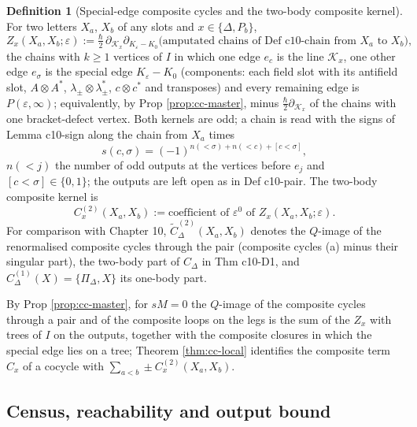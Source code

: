 \documentclass[11pt]{article}
\numberwithin{equation}{section}
\theoremstyle{plain}
\theoremstyle{definition}
\newtheorem{definition}[theorem]{Definition}
\begin{document}
\begin{definition}[Special-edge composite cycles and the two-body composite kernel]
\label{def:cc-sp}
For two letters $X_a$, $X_b$ of any slots and $x\in\{\Delta,P_b\}$,
\[
Z_x(X_a,X_b;\varepsilon):=\tfrac\hbar2\,\partial_{\mathcal K_x}\partial_{K_\varepsilon-K_0}\big(\text{amputated chains of Def c10-chain from }X_a\text{ to }X_b\big),
\]
the chains with $k\ge1$ vertices of $I$ in which one edge $e_c$ is the line $\mathcal K_x$, one other edge $e_\sigma$ is the special edge $K_\varepsilon-K_0$ (components: each field slot with its antifield slot, $A\otimes A^*$, $\lambda_\pm\otimes\lambda^*_\pm$, $c\otimes c^*$ and transposes) and every remaining edge is $P(\varepsilon,\infty)$; equivalently, by Prop \ref{prop:cc-master}, minus $\tfrac\hbar2\partial_{\mathcal K_x}$ of the chains with one bracket-defect vertex. Both kernels are odd; a chain is read with the signs of Lemma c10-sign along the chain from $X_a$ times
\[
s(c,\sigma)=(-1)^{n(<\sigma)+n(<c)+[c<\sigma]},
\]
$n(<j)$ the number of odd outputs at the vertices before $e_j$ and $[c<\sigma]\in\{0,1\}$; the outputs are left open as in Def c10-pair. The two-body composite kernel is
\[
C^{(2)}_x(X_a,X_b):=\text{coefficient of }\varepsilon^0\text{ of }Z_x(X_a,X_b;\varepsilon).
\]
For comparison with Chapter 10, $\widetilde C^{(2)}_\Delta(X_a,X_b)$ denotes the $Q$-image of the renormalised composite cycles through the pair (composite cycles (a) minus their singular part), the two-body part of $C_\Delta$ in Thm c10-D1, and $C^{(1)}_\Delta(X)=\{\Pi_\Delta,X\}$ its one-body part.
\end{definition}

By Prop \ref{prop:cc-master}, for $sM=0$ the $Q$-image of the composite cycles through a pair and of the composite loops on the legs is the sum of the $Z_x$ with trees of $I$ on the outputs, together with the composite closures in which the special edge lies on a tree; Theorem \ref{thm:cc-local} identifies the composite term $C_x$ of a cocycle with $\sum_{a<b}\pm C^{(2)}_x(X_a,X_b)$.

\subsection{Census, reachability and output bound}
\end{document}
